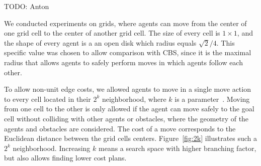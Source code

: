 \documentclass[review]{elsarticle}
\newcommand\roni[1]{\nb{\textbf{Roni:}}{green}{#1}}
\newcommand{\cbs}{\ac{CBS}\xspace}
\begin{document}
TODO: Anton




We conducted experiments on grids, where agents can move from the center of one grid cell 
to the center of another grid cell. 
The size of every cell is $1\times 1$, and 
the shape of every agent is a an open disk which radius equals $\sqrt{2}/4$. This specific value was chosen to allow comparison with \cbs, since it is the maximal radius that allows agents to safely perform moves in which agents follow each other.




To allow non-unit edge costs, we allowed agents to move in a single move action to every cell located in their $2^k$ neighborhood, where $k$ is a parameter~\cite{rivera2017grid}. Moving from one cell to the other is only allowed if the agent can move safely to the goal cell without colliding with other agents or obstacles, where the geometry of the agents and obstacles are considered. The cost of a move corresponds to the Euclidean distance between the grid cells centers.  Figure~\ref{fig:2k} illustrates such a $2^k$ neighborhood. Increasing $k$ means a search space with higher branching factor, but also allows finding lower cost plans. 
\end{document}
